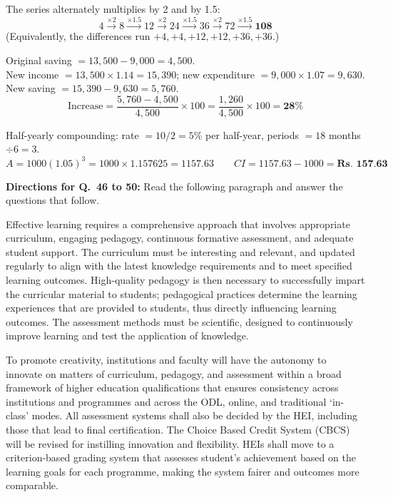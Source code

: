 The series alternately multiplies by 2 and by 1.5:
\[4\xrightarrow{\times2}8\xrightarrow{\times1.5}12\xrightarrow{\times2}24\xrightarrow{\times1.5}36\xrightarrow{\times2}72\xrightarrow{\times1.5}\mathbf{108}\]
(Equivalently, the differences run $+4,+4,+12,+12,+36,+36$.)

Original saving $=13{,}500-9{,}000=4{,}500$.\\
New income $=13{,}500\times1.14=15{,}390$; new expenditure $=9{,}000\times1.07=9{,}630$.\\
New saving $=15{,}390-9{,}630=5{,}760$.
\[\text{Increase}=\frac{5{,}760-4{,}500}{4{,}500}\times100=\frac{1{,}260}{4{,}500}\times100=\mathbf{28\%}\]

Half-yearly compounding: rate $=10/2=5\%$ per half-year, periods $=18$ months $\div 6 = 3$.
\[A=1000(1.05)^3=1000\times1.157625=1157.63\qquad CI=1157.63-1000=\textbf{Rs.\ 157.63}\]

\textbf{Directions for Q.~46 to 50:} Read the following paragraph and answer the questions that follow.\par\smallskip
Effective learning requires a comprehensive approach that involves appropriate curriculum, engaging pedagogy, continuous formative assessment, and adequate student support. The curriculum must be interesting and relevant, and updated regularly to align with the latest knowledge requirements and to meet specified learning outcomes. High-quality pedagogy is then necessary to successfully impart the curricular material to students; pedagogical practices determine the learning experiences that are provided to students, thus directly influencing learning outcomes. The assessment methods must be scientific, designed to continuously improve learning and test the application of knowledge.

To promote creativity, institutions and faculty will have the autonomy to innovate on matters of curriculum, pedagogy, and assessment within a broad framework of higher education qualifications that ensures consistency across institutions and programmes and across the ODL, online, and traditional `in-class' modes. All assessment systems shall also be decided by the HEI, including those that lead to final certification. The Choice Based Credit System (CBCS) will be revised for instilling innovation and flexibility. HEIs shall move to a criterion-based grading system that assesses student's achievement based on the learning goals for each programme, making the system fairer and outcomes more comparable.

